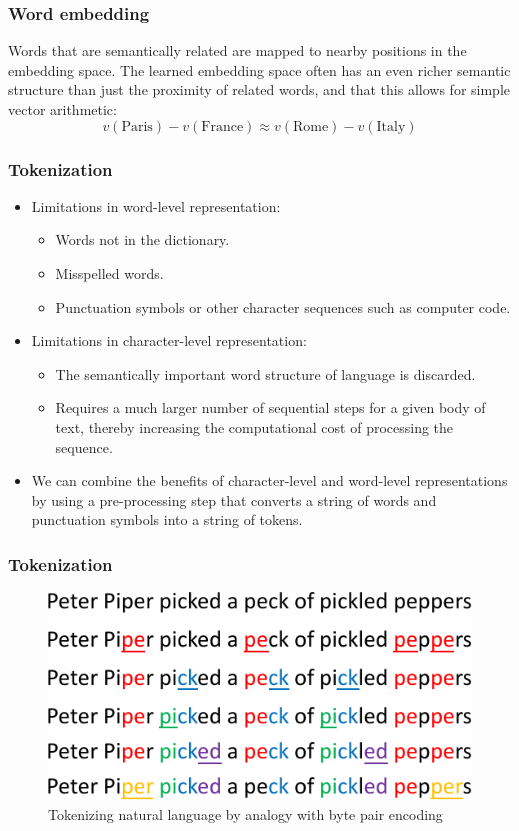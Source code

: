 \documentclass{beamer}
\begin{document}
\begin{frame}
    \frametitle{Word embedding}
    Words that are semantically related are mapped to nearby positions in the embedding space.
    \bigbreak
    The learned embedding space often has an even richer semantic structure than just the proximity of related words, and that this allows for simple vector arithmetic:
    \begin{equation*}
        v(\textrm{Paris})-v(\textrm{France})\approx{}v(\textrm{Rome})-v(\textrm{Italy})
    \end{equation*}
\end{frame}

\begin{frame}
    \frametitle{Tokenization}
    \begin{itemize}
        \item Limitations in word-level representation:
        \begin{itemize}
            \item Words not in the dictionary.
            \item Misspelled words.
            \item Punctuation symbols or other character sequences such as computer code.
        \end{itemize}
        \item Limitations in character-level representation:
        \begin{itemize}
            \item The semantically important word structure of language is discarded.
            \item Requires a much larger number of sequential steps for a given body of text, thereby increasing the computational cost of processing the sequence.
        \end{itemize}
        \item We can combine the benefits of character-level and word-level representations by using a pre-processing step that converts a string of words and punctuation symbols into a string of tokens.
    \end{itemize}
\end{frame}

\begin{frame}
    \frametitle{Tokenization}
    \begin{figure}
        \caption{Tokenizing natural language by analogy with byte pair encoding}
        \includegraphics{Figure_12.pdf}
    \end{figure}
\end{frame}
\end{document}
